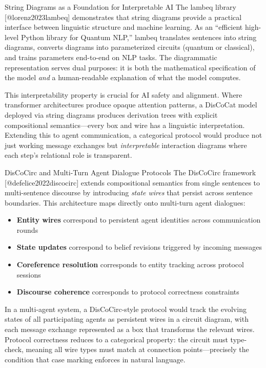 \documentclass[
  ignorenonframetext,
]{beamer}
\providecommand{\tightlist}{%
  \setlength{\itemsep}{0pt}\setlength{\parskip}{0pt}}
\begin{document}
\begin{frame}{String Diagrams as a Foundation for Interpretable AI}
\protect{}\label{string-diagrams-as-a-foundation-for-interpretable-ai}
The lambeq library {[}@lorenz2023lambeq{]} demonstrates that string
diagrams provide a practical interface between linguistic structure and
machine learning. As an ``efficient high-level Python library for
Quantum NLP,'' lambeq translates sentences into string diagrams,
converts diagrams into parameterized circuits (quantum or classical),
and trains parameters end-to-end on NLP tasks. The diagrammatic
representation serves dual purposes: it is both the mathematical
specification of the model \emph{and} a human-readable explanation of
what the model computes.

This interpretability property is crucial for AI safety and alignment.
Where transformer architectures produce opaque attention patterns, a
DisCoCat model deployed via string diagrams produces derivation trees
with explicit compositional semantics---every box and wire has a
linguistic interpretation. Extending this to agent communication, a
categorical protocol would produce not just working message exchanges
but \emph{interpretable} interaction diagrams where each step's
relational role is transparent.
\end{frame}

\begin{frame}{DisCoCirc and Multi-Turn Agent Dialogue Protocols}
\protect{}\label{discocirc-and-multi-turn-agent-dialogue-protocols}
The DisCoCirc framework {[}@defelice2022discocirc{]} extends
compositional semantics from single sentences to multi-sentence
discourse by introducing \emph{state wires} that persist across sentence
boundaries. This architecture maps directly onto multi-turn agent
dialogues:

\begin{itemize}
\tightlist
\item
  \textbf{Entity wires} correspond to persistent agent identities across
  communication rounds
\item
  \textbf{State updates} correspond to belief revisions triggered by
  incoming messages
\item
  \textbf{Coreference resolution} corresponds to entity tracking across
  protocol sessions
\item
  \textbf{Discourse coherence} corresponds to protocol correctness
  constraints
\end{itemize}

In a multi-agent system, a DisCoCirc-style protocol would track the
evolving states of all participating agents as persistent wires in a
circuit diagram, with each message exchange represented as a box that
transforms the relevant wires. Protocol correctness reduces to a
categorical property: the circuit must type-check, meaning all wire
types must match at connection points---precisely the condition that
case marking enforces in natural language.
\end{frame}
\end{document}
